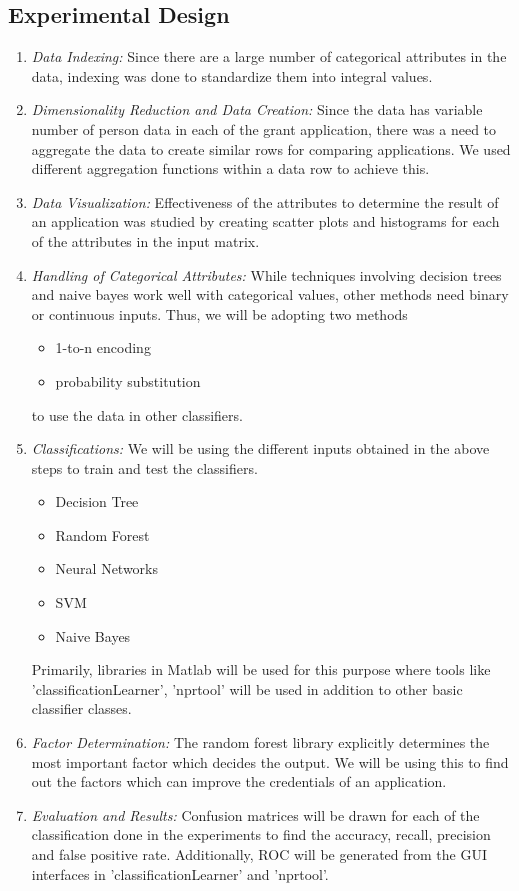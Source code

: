 \documentclass{article} %
\begin{document}
\subsection{Experimental Design}
\begin{enumerate}
	\item \emph{Data Indexing:} Since there are a large number of categorical attributes in the data, indexing was done to standardize them into integral values.
	\item \emph{Dimensionality Reduction and Data Creation:} Since the data has variable number of person data in each of the grant application, there was a need to aggregate the data to create similar rows for comparing applications. We used different aggregation functions within a data row\cite{OneRow} to achieve this.
	\item \emph{Data Visualization:} Effectiveness of the attributes to determine the result of an application was studied by creating scatter plots and histograms for each of the attributes in the input matrix. 
	\item \emph{Handling of Categorical Attributes:} While techniques involving decision trees and naive bayes work well with categorical values, other methods need binary or continuous inputs. Thus, we will be adopting two methods 
	\begin{itemize}
		\item 1-to-n encoding
		\item probability substitution \cite{HighCard}
	\end{itemize}  
	
	to use the data in other classifiers.

	
	\item \emph{Classifications:} We will be using the different inputs obtained in the above steps to train and test the classifiers.
	\begin{itemize}
		\item Decision Tree
		\item Random Forest
		\item Neural Networks
		\item SVM
		\item Naive Bayes
	\end{itemize}
	 Primarily, libraries in Matlab will be used for this purpose where tools like 'classificationLearner', 'nprtool' will be used in addition to other basic classifier classes.
	 
	 \item \emph{Factor Determination:} The random forest library explicitly determines the most important factor which decides the output. We will be using this to find out the factors which can improve the credentials of an application.
	 
	 \item \emph{Evaluation and Results:} Confusion matrices will be drawn for each of the classification done in the experiments to find the accuracy, recall, precision and false positive rate. Additionally, ROC will be generated from the GUI interfaces in 'classificationLearner' and 'nprtool'.
	
	\end{enumerate}
	
\end{document}
